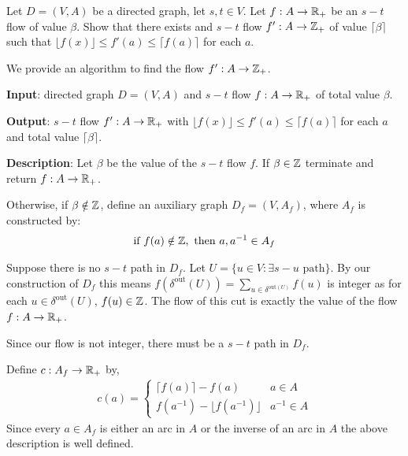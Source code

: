 \documentclass[10pt]{article}
\begin{document}
\maketitle



\begin{problem}[Problem 4.5]
    Let \( D=(V,A) \) be a directed graph, let \( s,t\in V \). Let \( f:A\to \mathbb{R}_+ \) be an \( s-t \) flow of value \( \beta \). Show that there exists and \( s-t \) flow \( f':A\to \mathbb{Z}_+ \) of value \( \lceil \beta \rceil \) such that \( \lfloor f(x) \rfloor \leq f'(a) \leq \lceil f(a) \rceil \) for each \( a \). 
\end{problem}

\begin{solution}

We provide an algorithm to find the flow \( f':A\to\mathbb{Z}_+ \).

\textbf{Input}: directed graph \( D = (V,A) \) and \( s-t \) flow \( f:A\to\mathbb{R}_+ \) of total value \( \beta \).

\textbf{Output}: \( s-t \) flow \( f':A\to\mathbb{R}_+ \) with \( \lfloor f(x) \rfloor \leq f'(a) \leq \lceil f(a) \rceil \) for each \( a \) and total value \( \lceil \beta \rceil \).

\textbf{Description}: Let \( \beta \) be the value of the \( s-t \) flow \( f \). If \( \beta\in \mathbb{Z} \) terminate and return \( f:A\to\mathbb{R}_+ \).

Otherwise, if \( \beta\notin\mathbb{Z} \), define an auxiliary graph \( D_f = (V,A_f) \), where \( A_f \) is constructed by:
\begin{align*}
    \text{if } f(a) \notin \mathbb{Z}, \text{ then } a,a^{-1} \in A_f
\end{align*}

Suppose there is no \( s-t \) path in \( D_f \). Let \( U = \{ u\in V : \exists s-u \text{ path}\} \). By our construction of \( D_f \) this means \( f(\delta^{\text{out}}(U)) = \sum_{u\in\delta^{\text{out}(U)}} f(u) \) is integer as for each \( u\in \delta^{\text{out}}(U) \), \( f(u)\in\mathbb{Z} \). The flow of this cut is exactly the value of the flow \( f:A\to\mathbb{R}_+ \).

Since our flow is not integer, there must be a \( s-t \) path in \( D_f \).

Define \( c:A_f\to\mathbb{R}_+ \) by,
\begin{align*}
    c(a) = \begin{cases}
        \lceil f(a) \rceil - f(a) & a\in A \\
        f(a^{-1}) - \lfloor f(a^{-1}) \rfloor & a^{-1} \in A
    \end{cases}  
\end{align*}
Since every \( a\in A_f \) is either an arc in \( A \) or the inverse of an arc in \( A \) the above description is well defined. 


\end{solution}
\end{document}
